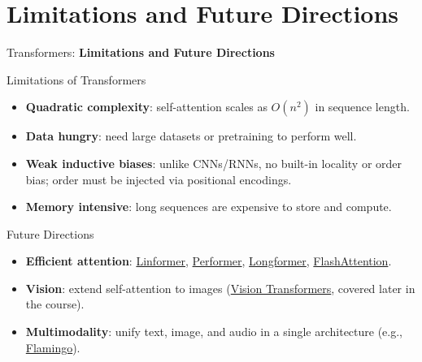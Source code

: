 \section{Limitations and Future Directions}
\begin{frame}{}
    \LARGE Transformers: \textbf{Limitations and Future Directions}
\end{frame}

\begin{frame}{Limitations of Transformers}
    \begin{itemize}
        \item \textbf{Quadratic complexity}: self-attention scales as $O(n^2)$ in sequence length.
        \item \textbf{Data hungry}: need large datasets or pretraining to perform well.
        \item \textbf{Weak inductive biases}: unlike CNNs/RNNs, no built-in locality or order bias; order must be injected via positional encodings.
        \item \textbf{Memory intensive}: long sequences are expensive to store and compute.
    \end{itemize}
\end{frame}

\begin{frame}{Future Directions}
    \begin{itemize}
        \item \textbf{Efficient attention}: \href{https://arxiv.org/abs/2006.04768}{Linformer}, \href{https://arxiv.org/abs/2009.14794}{Performer}, \href{https://arxiv.org/abs/2004.05150}{Longformer}, \href{https://arxiv.org/abs/2205.14135}{FlashAttention}.
        \item \textbf{Vision}: extend self-attention to images (\href{https://arxiv.org/abs/2010.11929}{Vision Transformers}, covered later in the course).
        \item \textbf{Multimodality}: unify text, image, and audio in a single architecture (e.g., \href{https://arxiv.org/abs/2204.14198}{Flamingo}).
    \end{itemize}
\end{frame}
